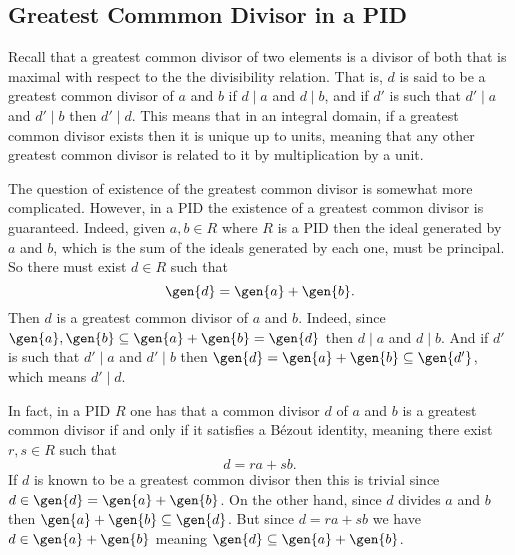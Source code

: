 \documentclass[12pt,oneside]{book}
\begin{document}
\subsection{Greatest Commmon Divisor in a PID}
Recall that a greatest common divisor of two elements is a divisor of both that is maximal
with respect to the the divisibility relation. That is, \( d \) is said to be a greatest
common divisor of \( a \) and \( b \) if \( d \mid a \) and \( d \mid b \), and if \( d'
\) is such that \( d' \mid a \) and \( d' \mid b \) then \( d' \mid d \). This means that
in an integral domain, if a greatest common divisor exists then it is unique up to units,
meaning that any other greatest common divisor is related to it by multiplication by a
unit.

The question of existence of the greatest common divisor is somewhat more
complicated. However, in a PID the existence of a greatest common divisor is guaranteed.
Indeed, given \( a, b \in R \) where \( R \) is a PID then the ideal generated by \( a \)
and \( b \), which is the sum of the ideals generated by each one, must be principal. So
there must exist \( d \in R \) such that
\begin{equation*}
	\gen{d} = \gen{a} + \gen{b}.
\end{equation*}
Then \( d \) is a greatest common divisor of \( a \) and \( b \). Indeed, since \(
\gen{a}, \gen{b} \subseteq \gen{a} + \gen{b} = \gen{d} \) then \( d \mid a \) and \( d
\mid b \). And if \( d' \) is such that \( d' \mid a \) and \( d' \mid b \) then \(
\gen{d} = \gen{a} + \gen{b} \subseteq \gen{d'} \), which means \( d' \mid d \).

In fact, in a PID \( R \) one has that a common divisor \( d \) of \( a \) and \( b \) is a
greatest common divisor if and only if it satisfies a Bézout identity, meaning there exist
\( r, s \in R \) such that
\begin{equation*}
	d = ra + sb.
\end{equation*}
If \( d \) is known to be a greatest common divisor then this is trivial since \( d \in \gen{d}
= \gen{a} + \gen{b} \). On the other hand, since \( d \) divides \( a \) and \( b \) then
\( \gen{a} + \gen{b} \subseteq \gen{d} \). But since \( d = ra + sb \) we have \( d \in
\gen{a} + \gen{b} \) meaning \( \gen{d} \subseteq \gen{a} + \gen{b} \).
\end{document}
